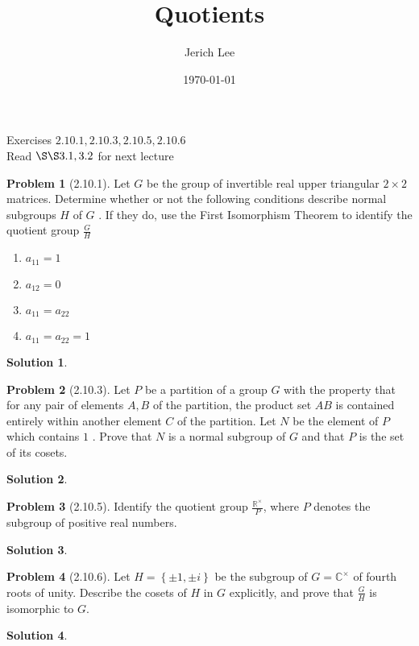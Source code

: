 \documentclass[12pt]{article}
\title{Quotients}
\author{Jerich Lee}
\date{\today}
\theoremstyle{definition} %
\newtheorem{solution}{Solution}
\newtheorem{problem}{Problem}
\theoremstyle{plain} %
\begin{document}
\maketitle
Exercises $2.10.1, 2.10.3, 2.10.5, 2.10.6$ \\
Read $\S\S 3.1, 3.2$ for next lecture 
\begin{problem}[2.10.1]
    Let $G$ be the group of invertible real upper triangular $2\times 2$ matrices. Determine whether or not the following conditions describe normal subgroups $H$ of $G$ . If they do, use the First Isomorphism Theorem to identify the quotient group $\frac{G}{H}$
    \noindent
    \begin{enumerate}
        \item $a_{11}=1 $
        \item $a_{12}=0 $
        \item $a_{11} =a_{22} $
        \item $a_{11} =a_{22} =1$    
    \end{enumerate}  
\end{problem}
\begin{solution}
    
\end{solution}
\begin{problem}[2.10.3]
   Let $P$ be a partition of a group $G$ with the property that for any pair of elements $A,B$ of the partition, the product set $AB$ is contained entirely within another element $C$ of the partition. Let $N$ be the element of $P$ which contains $1$ . Prove that $N$ is a normal subgroup of $G$ and that $P$ is the set of its cosets. 
\end{problem}
\begin{solution}
    
\end{solution}
\begin{problem}[2.10.5]
   Identify the quotient group $\frac{\mathbb{{R}}^{\times}}{P}$, where $P$ denotes the subgroup of positive real numbers.  
\end{problem}
\begin{solution}
    
\end{solution}
\begin{problem}[2.10.6]
  Let $H=\left\{ \pm 1, \pm i \right\} $  be the subgroup of $G=\mathbb{{C}}^{\times}$ of fourth roots of unity. Describe the cosets of $H$ in $G$ explicitly, and prove that $\frac{G}{H}$   is isomorphic to $G$. 
\end{problem}
\begin{solution}
    
\end{solution}
\end{document}
